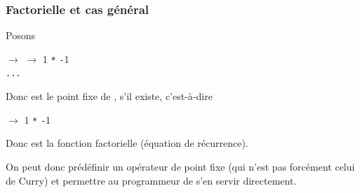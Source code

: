 %
\begin{frame}
\frametitle{Factorielle et cas général}

 Posons

{\small
 \begin{tabbing}
 \quad \Xlet {} \equal \Xfun {} $\rightarrow$
 \Xfun {} $\rightarrow$   \Xthen \num{1}
 \Xelse {} \texttt{*} 
 \lpar{}\texttt{-}\num{1}\rpar{} \Xin\\
 \quad \Xlet {} \equal {} \lpar{}\rpar{}
 \Xin \texttt{...}
 \end{tabbing}
}

Donc  est le point fixe de , s'il existe,
c'est-à-dire

\bigskip

\centerline{\small {} \equal {}
 \lpar{}\rpar{} \equal \Xfun {} $\rightarrow$ 
  \Xthen \num{1} \Xelse {} \texttt{*} 
 \lpar{}\texttt{-}\num{1}\rpar }

\bigskip

Donc  est la fonction factorielle (équation de récurrence).

\bigskip

On peut donc prédéfinir un opérateur de point fixe  (qui n'est
pas forcément celui de Curry) et permettre au programmeur de s'en
servir directement.

\end{frame}

